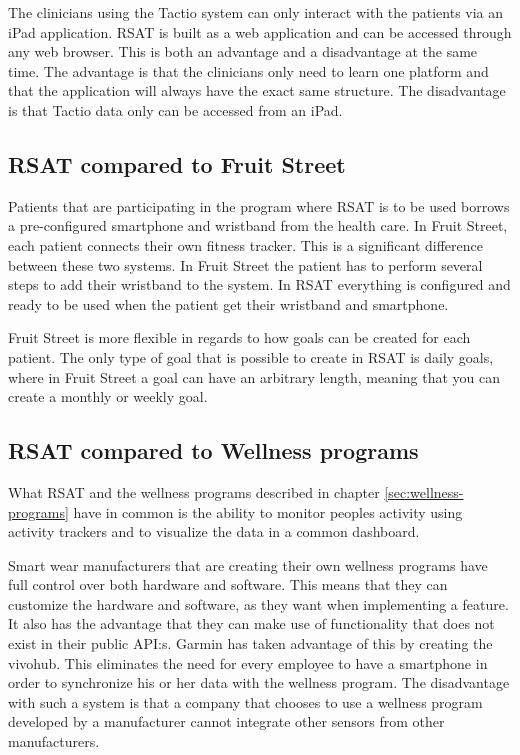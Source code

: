 \documentclass{cslthse-msc}
\begin{document}
The  clinicians using the Tactio system can only interact with the patients via an iPad application. RSAT is built as a web application and can be accessed through any web browser. This is both an advantage and a disadvantage at the same time. The advantage is that the clinicians only need to learn one platform and that the application will always have the exact same structure. The disadvantage is that Tactio data only can be accessed from an iPad.

\subsection{RSAT compared to Fruit Street}

Patients that are participating in the program where RSAT is to be used borrows a pre-configured smartphone and wristband from the health care. In Fruit Street, each patient connects their own fitness tracker. This is a significant difference between these two systems. In Fruit Street the patient has to perform several steps to add their wristband to the system. In RSAT everything is configured and ready to be used when the patient get their wristband and smartphone. 

Fruit Street is more flexible in regards to how goals can be created for each patient. The only type of goal that is possible to create in RSAT is daily goals, where in Fruit Street a goal can have an arbitrary length, meaning that you can create a monthly or weekly goal.

\subsection{RSAT compared to Wellness programs}

What RSAT and the wellness programs described in chapter \ref{sec:wellness-programs} have in common is the ability to monitor peoples activity using activity trackers and to visualize the data in a common dashboard. 

Smart wear manufacturers that are creating their own wellness programs have full control over both hardware and software. This means that they can customize the hardware and software, as they want when implementing a feature. It also has the advantage that they can make use of functionality that does not exist in their public API:s. Garmin has taken advantage of this by creating the vivohub. This eliminates the need for every employee to have a smartphone in order to synchronize his or her data with the wellness program. The disadvantage with such a system is that a company that chooses to use a wellness program developed by a manufacturer cannot integrate other sensors from other manufacturers. 
\end{document}
